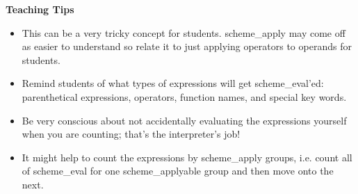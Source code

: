\begin{blocksection}
\begin{guide}
\textbf{Teaching Tips}
\begin{itemize}
	\item This can be a very tricky concept for students. scheme\_apply may come off as easier to understand so relate it to just applying operators to operands for students.
	\item Remind students of what types of expressions will get scheme\_eval'ed: parenthetical expressions, operators, function names, and special key words.
	\item Be very conscious about not accidentally evaluating the expressions yourself when you are counting; that's the interpreter's job!
	\item It might help to count the expressions by scheme\_apply groups, i.e. count all of scheme\_eval for one scheme\_applyable group and then move onto the next.
\end{itemize}
\end{guide}
\end{blocksection}
